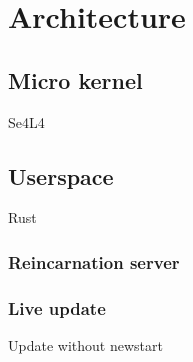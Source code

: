 \section{Architecture}

\subsection{Micro kernel}

Se4L4

\subsection{Userspace}

Rust


\subsubsection{Reincarnation server}

\subsubsection{Live update}
Update without newstart
